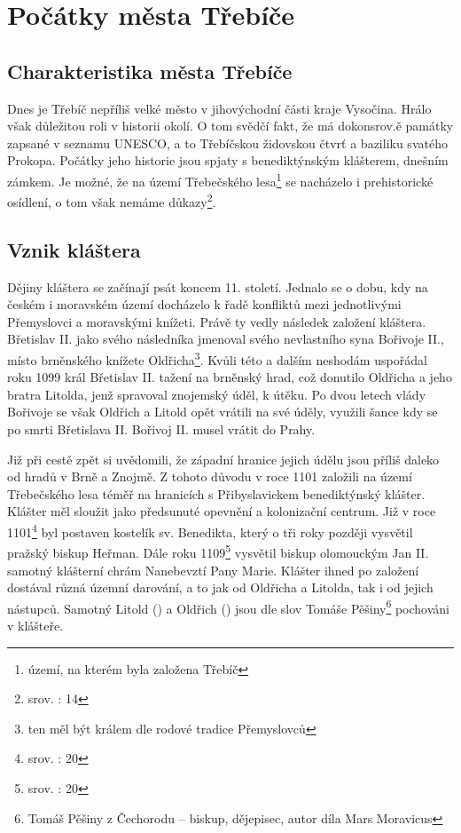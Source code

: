 \documentclass[a4paper,oneside,12p]{report}
\begin{document}


\tableofcontents
\newpage




\setcounter{page}{1}

\chapter{Počátky města Třebíče}

\section{Charakteristika města Třebíče}

Dnes je Třebíč nepříliš velké město v jihovýchodní části kraje Vysočina.
Hrálo však důležitou roli v historii okolí.
O tom svědčí fakt, že má dokonsrov.ě památky zapsané v seznamu UNESCO, a to Třebíčskou židovskou čtvrť a baziliku svatého Prokopa.
Počátky jeho historie jsou spjaty s benediktýnským klášterem, dnešním zámkem.
Je možné, že na území Třebečského lesa\footnote{území, na kterém byla založena Třebíč} se nacházelo i prehistorické osídlení, o tom však nemáme důkazy\footnote{srov. : 14}.

\section{Vznik kláštera}

Dějiny kláštera se začínají psát koncem 11. století.
Jednalo se o dobu, kdy na českém i moravském území docházelo k řadě konfliktů mezi jednotlivými Přemyslovci a moravskými knížeti. Právě ty vedly následek založení kláštera.
Břetislav II. jako svého následníka jmenoval svého nevlastního syna Bořivoje II., místo brněnského knížete Oldřicha\footnote{ten měl být králem dle rodové tradice Přemyslovců}.
Kvůli této a dalším neshodám uspořádal roku 1099 král Břetislav II. tažení na brněnský hrad, což donutilo Oldřicha a jeho bratra Litolda, jenž spravoval znojemský úděl, k útěku.
Po dvou letech vlády Bořivoje se však Oldřich a Litold opět vrátili na své úděly, využili šance kdy se po smrti Břetislava II. Bořivoj II. musel vrátit do Prahy.

Již při cestě zpět si uvědomili, že západní hranice jejich údělu jsou příliš daleko od hradů v Brně a Znojmě.
Z tohoto důvodu v roce 1101 založili na území Třebečského lesa téměř na hranicích s Přibyslavickem benediktýnský klášter.
Klášter měl sloužit jako předsunuté opevnění a kolonizační centrum.
Již v roce 1101\footnote{srov. \cite{Uhlir1978}: 20} byl postaven kostelík sv. Benedikta, který o tři roky později vysvětil pražský biskup Heřman.
Dále roku 1109\footnote{srov. \cite{Uhlir1978}: 20} vysvětil biskup olomouckým Jan II. samotný klášterní chrám Nanebevztí Pany Marie.
Klášter ihned po založení dostával různá územní darování, a to jak od Oldřicha a Litolda, tak i od jejich nástupců.
Samotný Litold () a Oldřich () jsou dle slov Tomáše Pěšiny\footnote{Tomáš Pěšiny z Čechorodu -- biskup, dějepisec, autor díla Mars Moravicus} pochováni v klášteře.
\end{document}
